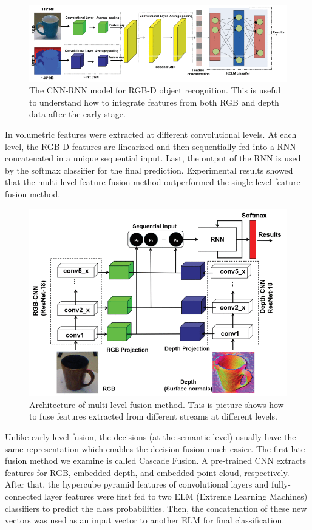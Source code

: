 \begin{figure}[h!]
	\centering
	\includegraphics[width=0.8\linewidth]{images/cnn_early.png}
	\caption{The CNN-RNN model for RGB-D object recognition. This is useful to understand how to integrate features from both RGB and depth data after the early stage.}
\end{figure}

\newpage

In \cite{loghmani2019recurrent} volumetric features were extracted at different convolutional levels. At each level, the RGB-D features are linearized and then sequentially fed into a RNN concatenated in a unique sequential input. Last, the output of the RNN is used by the softmax classifier for the final prediction. Experimental results showed that the multi-level feature fusion method outperformed the single-level feature fusion method. 

\begin{figure}[h!]
	\centering
	\includegraphics[width=0.8\linewidth]{images/sequential_fusion.png}
	\caption{Architecture of multi-level fusion method. This is picture shows how to fuse features extracted from different streams at different levels.}
\end{figure}

\newpage

Unlike early level fusion, the decisions (at the semantic level) usually have the same representation which enables the decision fusion much easier. The first late fusion method we examine is called Cascade Fusion. A pre-trained CNN extracts features for RGB, embedded depth, and embedded point cloud, respectively. After that, the hypercube pyramid features of convolutional layers and fully-connected layer features were first fed to two ELM (Extreme Learning Machines) classifiers to predict the class probabilities. Then, the concatenation of these new vectors was used as an input vector to another ELM for final classification.

